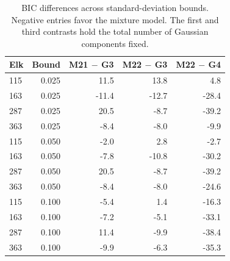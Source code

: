 \begin{table}[tbp]
\centering\small
\caption{BIC differences across standard-deviation bounds. Negative entries favor the mixture model. The first and third contrasts hold the total number of Gaussian components fixed.}\label{tab:si-sensitivity}
\begin{tabular}{lrrrr}\toprule
Elk & Bound & M21 $-$ G3 & M22 $-$ G3 & M22 $-$ G4 \\\midrule
115 & 0.025 & 11.5 & 13.8 & 4.8 \\
163 & 0.025 & -11.4 & -12.7 & -28.4 \\
287 & 0.025 & 20.5 & -8.7 & -39.2 \\
363 & 0.025 & -8.4 & -8.0 & -9.9 \\
115 & 0.050 & -2.0 & 2.8 & -2.7 \\
163 & 0.050 & -7.8 & -10.8 & -30.2 \\
287 & 0.050 & 20.5 & -8.7 & -39.2 \\
363 & 0.050 & -8.4 & -8.0 & -24.6 \\
115 & 0.100 & -5.4 & 1.4 & -16.3 \\
163 & 0.100 & -7.2 & -5.1 & -33.1 \\
287 & 0.100 & 11.4 & -9.9 & -38.4 \\
363 & 0.100 & -9.9 & -6.3 & -35.3 \\
\bottomrule\end{tabular}
\end{table}
